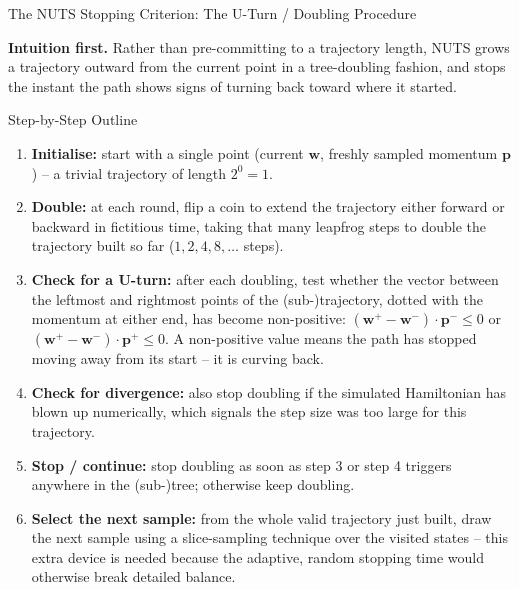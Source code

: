 \documentclass[aspectratio=169,10pt]{beamer}
\newcommand{\bw}{\mathbf{w}}
\newcommand{\bp}{\mathbf{p}}
\begin{document}
\begin{frame}{The NUTS Stopping Criterion: The U-Turn / Doubling Procedure}

\textbf{Intuition first.} Rather than pre-committing to a trajectory length, NUTS grows a trajectory outward from the current point in a tree-doubling fashion, and stops the instant the path shows signs of turning back toward where it started.

\begin{block}{Step-by-Step Outline}
\begin{enumerate}
  \item \textbf{Initialise:} start with a single point (current $\bw$, freshly sampled momentum $\bp$) -- a trivial trajectory of length $2^0=1$.
  \item \textbf{Double:} at each round, flip a coin to extend the trajectory either forward or backward in fictitious time, taking that many leapfrog steps to double the trajectory built so far ($1, 2, 4, 8,\dots$ steps).
  \item \textbf{Check for a U-turn:} after each doubling, test whether the vector between the leftmost and rightmost points of the (sub-)trajectory, dotted with the momentum at either end, has become non-positive: $(\bw^{+} - \bw^{-})\cdot \bp^{-} \le 0$ or $(\bw^{+}-\bw^{-})\cdot \bp^{+} \le 0$. A non-positive value means the path has stopped moving away from its start -- it is curving back.
  \item \textbf{Check for divergence:} also stop doubling if the simulated Hamiltonian has blown up numerically, which signals the step size was too large for this trajectory.
  \item \textbf{Stop / continue:} stop doubling as soon as step 3 or step 4 triggers anywhere in the (sub-)tree; otherwise keep doubling.
  \item \textbf{Select the next sample:} from the whole valid trajectory just built, draw the next sample using a slice-sampling technique over the visited states -- this extra device is needed because the adaptive, random stopping time would otherwise break detailed balance.
\end{enumerate}
\end{block}

\end{frame}
\end{document}
